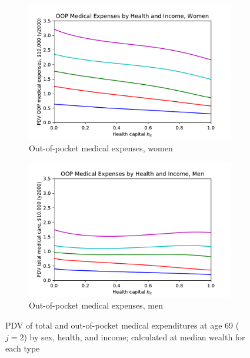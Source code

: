 \documentclass[12pt,pdftex,letterpaper]{article}
\newcommand{\Age}{j}
\begin{document}
\begin{figure}[h!]
\begin{subfigure}[b]{0.49\textwidth}
        \includegraphics[width=\textwidth]{../Figures/OOPmedPDVbyIncomeWomen.pdf}
        \caption{Out-of-pocket medical expenses, women}
    \end{subfigure}
    \begin{subfigure}[b]{0.49\textwidth}
        \centering
        \includegraphics[width=\textwidth]{../Figures/OOPmedPDVbyIncomeMen.pdf}
        \caption{Out-of-pocket medical expenses, men}
    \end{subfigure}
    \caption{PDV of total and out-of-pocket medical expenditures at age 69 ($\Age=2$) by sex, health, and income; calculated at median wealth for each type}
    \label{fig:MedPDV}
\end{figure}
\end{document}
